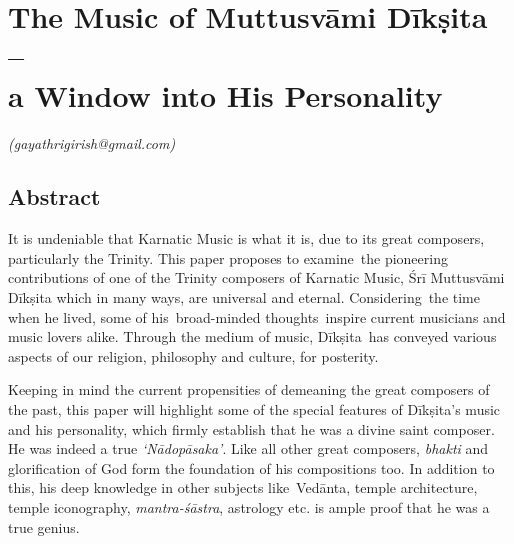 
\chapter{The Music of Muttusvāmi Dīkṣita –\\ a Window into His Personality}\label{chapter1}


\vspace{-.3cm}


\begin{flushright}
\textit{(gayathrigirish@gmail.com)}
\end{flushright}


\section*{Abstract}

It is undeniable that Karnatic Music is what it is, due to its great composers, particularly the Trinity. This paper proposes to examine the pioneering contributions of one of the Trinity composers of Karnatic Music, Śrī Muttusvāmi Dīkṣita which in many ways, are universal and eternal. Considering the time when he lived, some of his broad-minded thoughts inspire current musicians and music lovers alike. Through the medium of music, Dīkṣita has conveyed various aspects of our religion, philosophy and culture, for posterity.

Keeping in mind the current propensities of demeaning the great composers of the past, this paper will highlight some of the special features of Dīkṣita’s music and his personality, which firmly establish that he was a divine saint composer. He was indeed a true \textit{‘Nādopāsaka’}. Like all other great composers, \textit{bhakti} and glorification of God form the foundation of his compositions too. In addition to this, his deep knowledge in other subjects like Vedānta, temple architecture, temple iconography, \textit{mantra-śāstra}, astrology etc. is ample proof that he was a true genius. 

